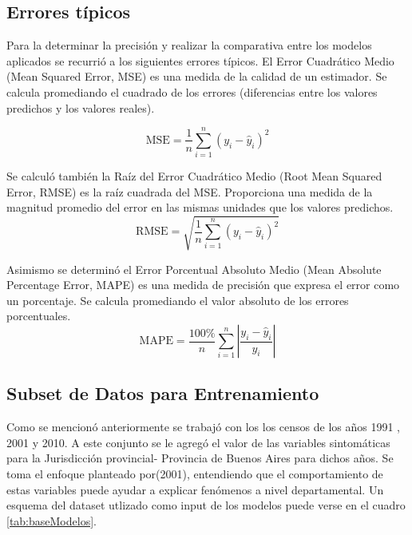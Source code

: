 \documentclass{article}
\theoremstyle{mytheoremstyle}
\theoremstyle{mytheoremstyle}
\theoremstyle{myproblemstyle}
\begin{document}
\subsection{Errores típicos}
 Para la determinar la precisión y realizar la comparativa entre los modelos aplicados se recurrió a los siguientes errores típicos.\newline
El Error Cuadrático Medio (Mean Squared Error, MSE) es una medida de la calidad de un estimador.
Se calcula promediando el cuadrado de los errores (diferencias entre los valores predichos y los valores reales).\newline

  \[
    \text{MSE} = \frac{1}{n} \sum_{i=1}^{n} (y_i - \hat{y}_i)^2
  \]

Se calculó también la Raíz del Error Cuadrático Medio (Root Mean Squared Error, RMSE) es la raíz cuadrada del MSE.
Proporciona una medida de la magnitud promedio del error en las mismas unidades que los valores predichos.\newline   
\[
\text{RMSE} = \sqrt{\frac{1}{n} \sum_{i=1}^{n} (y_i - \hat{y}_i)^2}
\]
 
Asimismo se determinó el Error Porcentual Absoluto Medio (Mean Absolute Percentage Error, MAPE) es 
una medida de precisión que expresa el error como un porcentaje. 
Se calcula promediando el valor absoluto de los errores porcentuales.
\[
\text{MAPE} = \frac{100\%}{n} \sum_{i=1}^{n} \left| \frac{y_i - \hat{y}_i}{y_i} \right|
\]

\subsection{Subset de Datos para Entrenamiento}
 Como se mencionó anteriormente se trabajó con los los censos de los años 1991 , 2001 y 2010. A este conjunto se le agregó el valor
 de las variables sintomáticas para la Jurisdicción provincial- Provincia de Buenos Aires para dichos años.
 Se toma el enfoque planteado por(2001),
entendiendo que el comportamiento de estas variables puede ayudar a explicar fenómenos a nivel departamental.\newline
 Un esquema del dataset utlizado como input de los modelos puede verse en el cuadro \ref{tab:baseModelos}.
\end{document}
